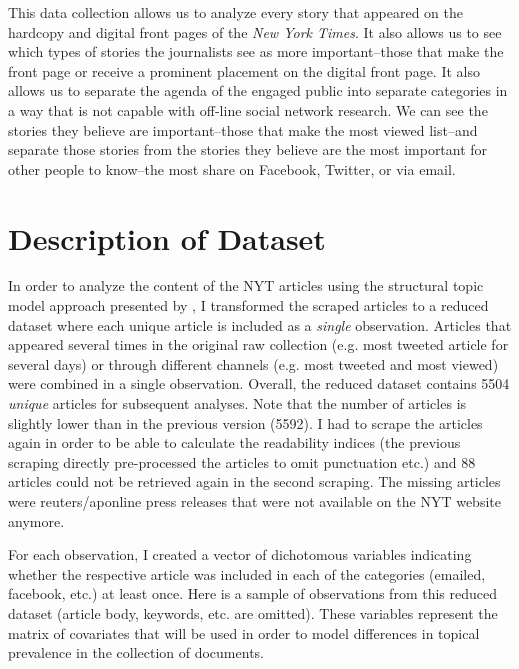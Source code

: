 \documentclass[12pt]{article}
\begin{document}
\begin{doublespace}
This data collection allows us to analyze every story that appeared on the hardcopy and digital front pages of the \textit{New York Times}. It also allows us to see which types of stories the journalists see as more important--those that make the front page or receive a prominent placement on the digital front page. It also allows us to separate the agenda of the engaged public into separate categories in a way that is not capable with off-line social network research. We can see the stories they believe are important--those that make the most viewed list--and separate those stories from the stories they believe are the most important for other people to know--the most share on Facebook, Twitter, or via email.




\section{Description of Dataset}

In order to analyze the content of the NYT articles using the structural topic model approach presented by \citet{roberts2014structural}, I transformed the scraped articles to a reduced dataset where each unique article is included as a \textit{single} observation. Articles that appeared several times in the original raw collection (e.g. most tweeted article for several days) or through different channels (e.g. most tweeted and most viewed) were combined in a single observation. Overall, the reduced dataset contains 5504 \textit{unique} articles for subsequent analyses. Note that the number of articles is slightly lower than in the previous version (5592). I had to scrape the articles again in order to be able to calculate the readability indices (the previous scraping directly pre-processed the articles to omit punctuation etc.) and 88 articles could not be retrieved again in the second scraping. The missing articles were reuters/aponline press releases that were not available on the NYT website anymore.

For each observation, I created a vector of dichotomous variables indicating whether the respective article was included in each of the categories (emailed, facebook, etc.) at least once. Here is a sample of observations from this reduced dataset (article body, keywords, etc. are omitted). These variables represent the matrix of covariates that will be used in order to model differences in topical prevalence in the collection of documents.




\end{doublespace}
\end{document}
